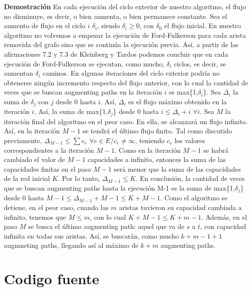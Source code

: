 \documentclass{article}
\begin{document}
\textbf{Demostración} En cada ejecución del ciclo exterior de nuestro algoritmo, el flujo no disminuye, es decir, o bien aumenta, o bien permanece constante. Sea el aumento de flujo en el ciclo $i$ $\delta_i$, siendo $\delta_i \geq 0$, con $\delta_0$ el flujo inicial. En nuestro algoritmo no volvemos a empezar la ejecución de Ford-Fulkerson para cada arista removida del grafo sino que se continúa la ejecución previa. Así, a partir de las afirmaciones 7.2 y 7.3 de Kleinberg y Tardos podemos concluir que en cada ejecución de Ford-Fulkerson se ejecutan, como mucho, $\delta_i$ ciclos, es decir, se aumentan $\delta_i$ caminos. En algunas iteraciones del ciclo exterior podría no obtenerse ningún incremento respecto del flujo anterior, con lo cual la cantidad de veces que se buscan augmenting paths en la iteración $i$ es max\{1,$\delta_i$\}. Sea $\Delta_i$ la suma de $\delta_j$ con $j$ desde $0$ hasta $i$. Así, $\Delta_i$ es el flujo máximo obtenido en la iteración $i$. Así, la suma de max\{1,$\delta_j$\} desde $0$ hasta $i \leq \Delta_i + i$ $\forall i$. Sea $M$ la iteración final del algoritmo en el peor caso. En ella, se alcanzará un flujo infinito. Así, en la iteración $M-1$ se tendrá el último flujo finito. Tal como discutido previamente, $\Delta_{M-1} \leq \sum c_e$ $\forall e \in E / c_e \neq \infty$, teniendo $c_e$ los valores correspondientes a la iteración $M-1$. Como en la iteración $M-1$ se habrá cambiado el valor de $M-1$ capacidades a infinito, entonces la suma de las capacidades finitas en el paso $M-1$ será menor que la suma de las capacidades de la red inicial $K$. Por lo tanto, $\Delta_{M-1}\leq K$. En conclusión, la cantidad de veces que se buscan augmenting paths hasta la ejecución M-1 es la suma de max\{1,$\delta_j$\} desde $0$ hasta $M-1 \leq \Delta_{M-1} + M - 1 \leq K + M - 1$. Como el algoritmo se detiene, en el peor caso, cuando las $m$ aristas tuvieron su capacidad cambiada a infinito, tenemos que $M \leq m$, con lo cual $K+M-1 \leq K+m-1$. Además, en el paso $M$ se busca el último augmenting path: aquel que va de $s$ a $t$, con capacidad infinita en todas sus aristas. Así, se buscarán, como mucho $k+m-1+1$ augmneting paths, llegando así al máximo de $k+m$ augmenting paths.

\newpage

\part{Codigo fuente}











\end{document}

